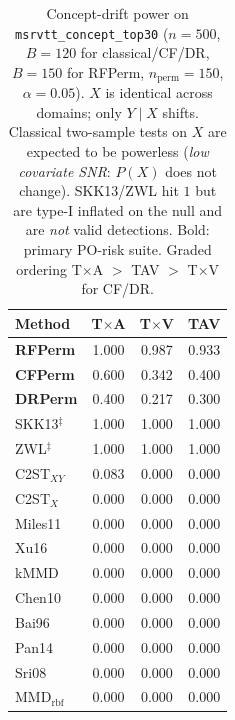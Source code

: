
\begin{table}[t]
\centering\small\setlength{\tabcolsep}{4pt}
\caption{Concept-drift power on \texttt{msrvtt\_concept\_top30}
  ($n=500$, $B=120$ for classical/CF/DR, $B=150$ for RFPerm, $n_{\mathrm{perm}}=150$, $\alpha=0.05$).
  $X$ is identical across domains; only $Y\mid X$ shifts.
  Classical two-sample tests on $X$ are expected to be powerless
  (\emph{low covariate SNR}: $P(X)$ does not change).
  SKK13/ZWL hit $1$ but are type-I inflated on the null and are \emph{not} valid detections.
  Bold: primary PO-risk suite. Graded ordering T$\times$A $>$ TAV $>$ T$\times$V for CF/DR.}
\label{tab:delivery-concept-combos}
\begin{tabular}{l ccc}
\toprule
Method & T$\times$A & T$\times$V & TAV \\
\midrule
\textbf{RFPerm} & 1.000 & 0.987 & 0.933 \\
\textbf{CFPerm} & 0.600 & 0.342 & 0.400 \\
\textbf{DRPerm} & 0.400 & 0.217 & 0.300 \\
\midrule
SKK13$^\ddagger$ & 1.000 & 1.000 & 1.000 \\
ZWL$^\ddagger$ & 1.000 & 1.000 & 1.000 \\
C2ST$_{XY}$ & 0.083 & 0.000 & 0.000 \\
C2ST$_X$ & 0.000 & 0.000 & 0.000 \\
Miles11 & 0.000 & 0.000 & 0.000 \\
Xu16 & 0.000 & 0.000 & 0.000 \\
kMMD & 0.000 & 0.000 & 0.000 \\
Chen10 & 0.000 & 0.000 & 0.000 \\
Bai96 & 0.000 & 0.000 & 0.000 \\
Pan14 & 0.000 & 0.000 & 0.000 \\
Sri08 & 0.000 & 0.000 & 0.000 \\
MMD$_{\mathrm{rbf}}$ & 0.000 & 0.000 & 0.000 \\
\bottomrule
\end{tabular}
\end{table}

